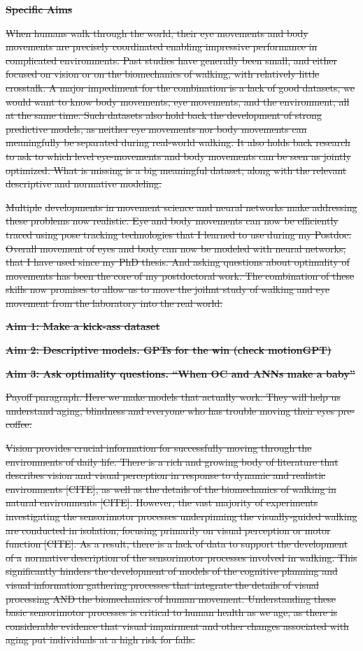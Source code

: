 \documentclass[
]{article}
\author{}
\date{}
\begin{document}
\textbf{\st{Specific Aims}}

\st{When humans walk through the world, their eye movements and body
movements are precisely coordinated enabling impressive performance in
complicated environments. Past studies have generally been small, and
either focused on vision or on the biomechanics of walking, with
relatively little crosstalk. A major impediment for the combination is a
lack of good datasets, we would want to know body movements, eye
movements, and the environment, all at the same time. Such datasets also
hold back the development of strong predictive models, as neither eye
movements nor body movements can meaningfully be separated during
real-world walking. It also holds back research to ask to which level
eye-movements and body movements can be seen as jointly optimized. What
is missing is a big meaningful dataset, along with the relevant
descriptive and normative modeling.}

\st{Multiple} \st{developments in movement science and neural networks
make addressing these problems now realistic. Eye and body movements can
now be efficiently traced using pose tracking technologies that I
learned to use during my Postdoc. Overall movement of eyes and body can
now be modeled with neural networks, that I have used since my PhD
thesis. And asking questions about optimality of movements has been the
core of my postdoctoral work. The combination of these skills now
promises to allow us to move the joihnt study of walking and eye
movement from the laboratory into the real world.}

\textbf{\st{Aim 1: Make a kick-ass dataset}}

\textbf{\st{Aim 2: Descriptive models. GPTs for the win (check
motionGPT)}}

\textbf{\st{Aim 3: Ask optimality questions. ``When OC and ANNs make a
baby''}}

\st{Payoff paragraph. Here we make models that actually work. They will
help us understand aging, blindness and everyone who has trouble moving
their eyes pre-coffee.}

\st{Vision provides crucial information for successfully moving through
the environments of daily life. There is a rich and growing body of
literature that describes vision and visual perception in response to
dynamic and realistic environments {[}CITE{]}, as well as the details of
the biomechanics of walking in natural environments {[}CITE{]}. However,
the vast majority of experiments investigating the sensorimotor
processes underpinning the visually-guided walking are conducted in
isolation, focusing primarily on visual perception or motor function
{[}CITE{]}. As a result, there is a lack of data to support the
development of a} \st{normative description of the sensorimotor
processes involved in walking. This significantly hinders the
development of models of the cognitive planning and visual information
gathering processes that integrate the details of visual processing AND
the biomechanics of human movement. Understanding these basic
sensorimotor processes is critical to human health as we age, as there
is considerable evidence that visual impairment and other changes
associated with aging put individuals at a high risk for falls.}
\end{document}
